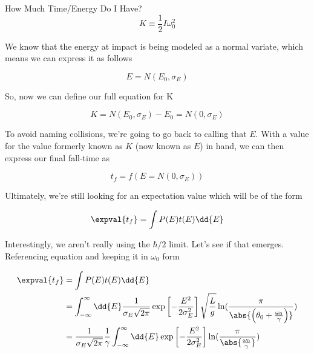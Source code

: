 \begin{answer}
\begin{answerpart}{How Much Time/Energy Do I Have?}
    \begin{equation}
      K \equiv \frac{1}{2}I\omega_0^2
    \end{equation}

    We know that the energy at impact is being modeled as a normal
    variate, which means we can express it as follows

    \begin{equation}
      E = N(E_0, \sigma_E)
    \end{equation}

    So, now we can define our full equation for K

    \begin{equation}
      K = N(E_0, \sigma_E) - E_0 = N(0, \sigma_E)
    \end{equation}

    To avoid naming collisions, we're going to go back to calling that
    $E$.  With a value for the value formerly known as $K$ (now known
    as $E$) in hand, we can then express our final fall-time as

    \begin{equation}
      t_f = f(E=N(0, \sigma_E))
    \end{equation}

    Ultimately, we're still looking for an expectation value which
    will be of the form

    \begin{equation}
      \expval{t_f} = \int P(E)t(E) \dd{E}
    \end{equation}

    Interestingly, we aren't really using the $\hbar/2$ limit.  Let's
    see if that emerges.  Referencing equation  and
    keeping it in $\omega_0$ form

    \begin{equation}
      \begin{alignedat}{2}
        &&\expval{t_f}
        &= \int P(E)t(E) \dd{E}\\
        &&&=
        \int_{-\infty}^{\infty}
        \dd{E}
        \frac{1}{\sigma_E\sqrt{2\pi}}
        \exp\left[-\frac{E^2}{2\sigma_E^2}\right]
        \sqrt{\frac{L}{g}}\ln(\frac{\pi}{\abs{
        \left(\theta_0 + \frac{\omega_0}{\gamma}\right)}})
        \\
        &&&=
        \frac{1}{\sigma_E\sqrt{2\pi}}
        \frac{1}{\gamma}
        \int_{-\infty}^{\infty}
        \dd{E}
        \exp\left[-\frac{E^2}{2\sigma_E^2}\right]
        \ln(\frac{\pi}{\abs{\frac{\omega_0}{\gamma}}})
        \\
      \end{alignedat}
    \end{equation}


\end{answerpart}
\end{answer}
